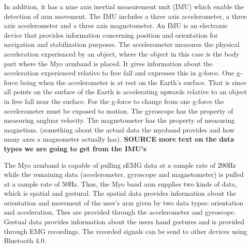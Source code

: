 In addition, it has a nine axis inertial measurement unit (IMU) which enable the detection of arm movement. The IMU includes a three axis accelerometer, a three axis accelerometer and a three axis magnetometer. An IMU is an electronic device that provides information concerning position and orientation for navigation and stabilization purposes. The accelerometer measures the physical acceleration experienced by an object, where the object in this case is the body part where the Myo armband is placed. It gives information about the acceleration experienced relative to free fall and expresses this in g-force. One g-force being when the accelerometer is at rest on the Earth's surface. That is since all points on the surface of the Earth is accelerating upwards relative to an object in free fall near the surface. For the g-force to change from one g-force the accelerometer must be exposed to motion. The gyroscope has the property of measuring angluar velocity. The magnetometer has the property of measuring magnetism. (something about the actual data the myoband provides and how many axes a magnometer actually has). \textbf{SOURCE}
\textbf{more text on the data types we are going to get from the IMU's} 


The Myo armband is capable of pulling sEMG data at a sample rate of 200Hz while the remaining data (accelerometer, gyroscope and magnetometer) is pulled at a sample rate of  50Hz. 
Thus, the Myo band arm supplies two kinds of data, which is spatial and gestural. The spatial data provides information about the orientation and movement of the user's arm given by two data types: orientation and acceleration. Thes are provided through the accelerometer and gyroscope. Gestual data provides information about the users hand gestures and is provided through EMG recordings. The recorded signals can be send to other devices using Bluetooth 4.0.







